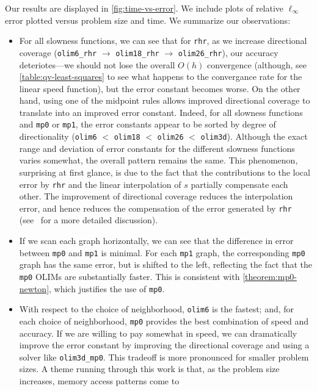 \documentclass[sisc-eikonal.tex]{subfiles}
\begin{document}
Our results are displayed in \cref{fig:time-vs-error}. We include
plots of relative $\ell_\infty$ error plotted versus problem size and
time. We summarize our observations:
\begin{itemize}
\item For all slowness functions, we can see that for \texttt{rhr}, as
  we increase directional coverage (\texttt{olim6\_rhr} $\to$
  \texttt{olim18\_rhr} $\to$ \texttt{olim26\_rhr}), our accuracy
  deteriotes---we should not lose the overall $O(h)$ convergence
  (although, see \cref{table:qv-least-squares} to see what happens to
  the convergance rate for the linear speed function), but the error
  constant becomes worse. On the other hand, using one of the midpoint
  rules allows improved directional coverage to translate into an
  improved error constant. Indeed, for all slowness functions and
  \texttt{mp0} or \texttt{mp1}, the error constants appear to be
  sorted by degree of directionality (\texttt{olim6} $<$
  \texttt{olim18} $<$ \texttt{olim26} $<$ \texttt{olim3d}). Although
  the exact range and deviation of error constants for the different
  slowness functions varies somewhat, the overall pattern remains the
  same. This phenomenon, surprising at first glance, is due to the
  fact that the contributions to the local error by \texttt{rhr} and
  the linear interpolation of $s$ partially compensate each other. The
  improvement of directional coverage reduces the interpolation error,
  and hence reduces the compensation of the error generated by
  \texttt{rhr} (see~\cite{yang2019computing} for a more detailed
  discussion).
\item If we scan each graph horizontally, we can see that the
  difference in error between \texttt{mp0} and \texttt{mp1} is
  minimal. For each \texttt{mp1} graph, the corresponding \texttt{mp0}
  graph has the same error, but is shifted to the left, reflecting the
  fact that the \texttt{mp0} OLIMs are substantially faster. This is
  consistent with \cref{theorem:mp0-newton}, which justifies the use
  of \texttt{mp0}.
\item With respect to the choice of neighborhood, \texttt{olim6} is
  the fastest; and, for each choice of neighborhood, \texttt{mp0}
  provides the best combination of speed and accuracy. If we are
  willing to pay somewhat in speed, we can dramatically improve the
  error constant by improving the directional coverage and using a
  solver like \texttt{olim3d\_mp0}. This tradeoff is more pronounced
  for smaller problem sizes. A theme running through this work is
  that, as the problem size increases, memory access patterns come to

\end{itemize}
\end{document}
